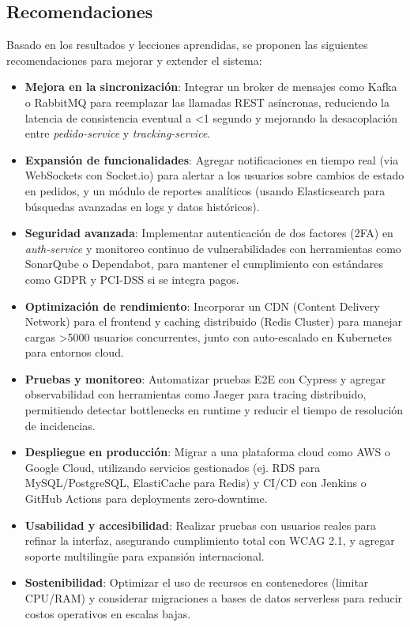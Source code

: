 \documentclass[a4paper,12pt]{article}
\begin{document}
\subsection{Recomendaciones}
Basado en los resultados y lecciones aprendidas, se proponen las siguientes recomendaciones para mejorar y extender el sistema:
\begin{itemize}
    \item \textbf{Mejora en la sincronización}: Integrar un broker de mensajes como Kafka o RabbitMQ para reemplazar las llamadas REST asíncronas, reduciendo la latencia de consistencia eventual a <1 segundo y mejorando la desacoplación entre \textit{pedido-service} y \textit{tracking-service}.
    
    \item \textbf{Expansión de funcionalidades}: Agregar notificaciones en tiempo real (via WebSockets con Socket.io) para alertar a los usuarios sobre cambios de estado en pedidos, y un módulo de reportes analíticos (usando Elasticsearch para búsquedas avanzadas en logs y datos históricos).
    
    \item \textbf{Seguridad avanzada}: Implementar autenticación de dos factores (2FA) en \textit{auth-service} y monitoreo continuo de vulnerabilidades con herramientas como SonarQube o Dependabot, para mantener el cumplimiento con estándares como GDPR y PCI-DSS si se integra pagos.
    
    \item \textbf{Optimización de rendimiento}: Incorporar un CDN (Content Delivery Network) para el frontend y caching distribuido (Redis Cluster) para manejar cargas >5000 usuarios concurrentes, junto con auto-escalado en Kubernetes para entornos cloud.
    
    \item \textbf{Pruebas y monitoreo}: Automatizar pruebas E2E con Cypress y agregar observabilidad con herramientas como Jaeger para tracing distribuido, permitiendo detectar bottlenecks en runtime y reducir el tiempo de resolución de incidencias.
    
    \item \textbf{Despliegue en producción}: Migrar a una plataforma cloud como AWS o Google Cloud, utilizando servicios gestionados (ej. RDS para MySQL/PostgreSQL, ElastiCache para Redis) y CI/CD con Jenkins o GitHub Actions para deployments zero-downtime.
    
    \item \textbf{Usabilidad y accesibilidad}: Realizar pruebas con usuarios reales para refinar la interfaz, asegurando cumplimiento total con WCAG 2.1, y agregar soporte multilingüe para expansión internacional.
    
    \item \textbf{Sostenibilidad}: Optimizar el uso de recursos en contenedores (limitar CPU/RAM) y considerar migraciones a bases de datos serverless para reducir costos operativos en escalas bajas.
\end{itemize}
\end{document}

